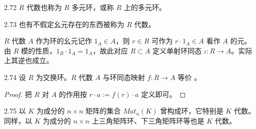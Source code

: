 
\begin{remark}{2.72} $R$ 代数也称为 $R$ 多元环，或称 $R$ 上的多元环。\end{remark}

\begin{remark}{2.73} 也有不假定幺元存在的东西被称为 $R$ 代数。\end{remark}


$R$ 代数 $A$ 作为环的幺元记作 $1_A\in A$，则 $r\in R$ 可作为 $r\cdot1_A\in A$ 看作 $A$ 的元。由 $R$ 模的性质，$1_R\cdot1_A=1_A$，故此对应 $R\subset A$ 定义单射环同态 $\iota\colon R\to A$。实际上其逆也成立。

\begin{lemma}{2.74} 设 $R$ 为交换环。$R$ 代数 $A$ 与环同态映射 $f\colon R\to A$ 等价
。\end{lemma}

\begin{proof}
把 $R$ 对 $A$ 的作用按 $r\cdot a:=f(r)\cdot a$ 定义即可。
\end{proof}


\begin{example}{2.75} 以 $K$ 为成分的 $n\times n$ 矩阵的集合 $\mathit{Mat}_n(K)$ 曾构成环，它特别是 $K$ 代数。同样，以 $K$ 为成分的 $n\times n$ 上三角矩阵环、下三角矩阵环等也是 $K$ 代数。\end{example}

